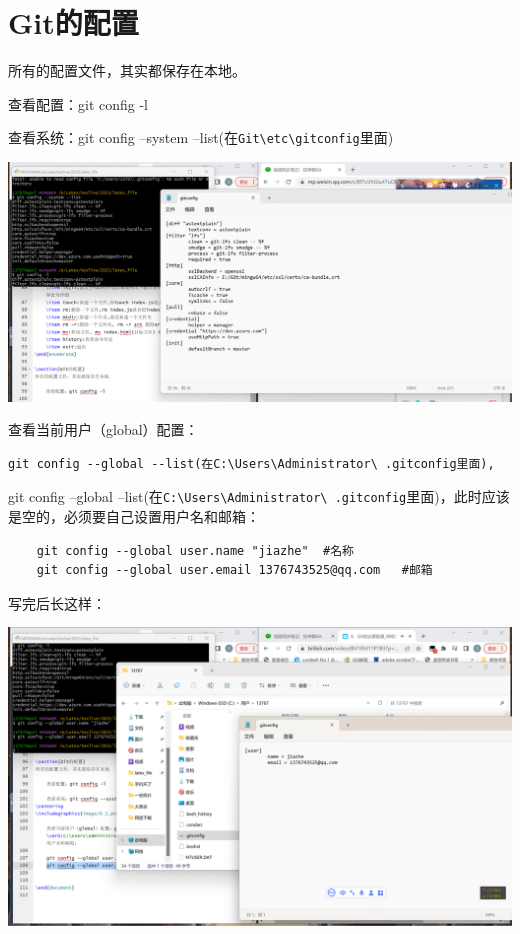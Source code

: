 \documentclass{article}
\begin{document}
\section{Git的配置}
\begin{flushleft}%
所有的配置文件，其实都保存在本地。

查看配置：git config -l

查看系统：git config --system --list(在\verb|Git\etc\gitconfig|里面)
\end{flushleft}

\centering   
\includegraphics{image/6.1.png}
\begin{flushleft}
查看当前用户（global）配置：
\begin{lstlisting}
git config --global --list(在C:\Users\Administrator\ .gitconfig里面), 
\end{lstlisting}
git config --global --list(在\verb|C:\Users\Administrator\ .gitconfig|里面)，此时应该是空的，必须要自己设置用户名和邮箱：
    
\begin{lstlisting}
    git config --global user.name "jiazhe"  #名称
    git config --global user.email 1376743525@qq.com   #邮箱
\end{lstlisting}
    写完后长这样：
\end{flushleft}

\centering
\includegraphics{image/6.2.png}
\end{document}
